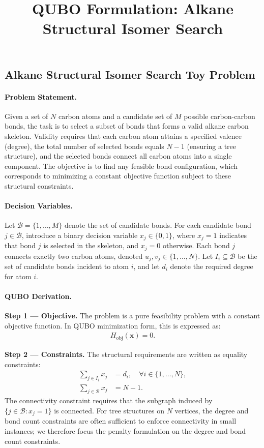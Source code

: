 \documentclass[12pt]{article}
\title{QUBO Formulation: Alkane Structural Isomer Search}
\date{}
\begin{document}
\maketitle

\subsection*{Alkane Structural Isomer Search Toy Problem}

\paragraph{Problem Statement.}
Given a set of $N$ carbon atoms and a candidate set of $M$ possible carbon-carbon bonds, the task is to select a subset of bonds that forms a valid alkane carbon skeleton. Validity requires that each carbon atom attains a specified valence (degree), the total number of selected bonds equals $N-1$ (ensuring a tree structure), and the selected bonds connect all carbon atoms into a single component. The objective is to find any feasible bond configuration, which corresponds to minimizing a constant objective function subject to these structural constraints.

\paragraph{Decision Variables.}
Let $\mathcal{B} = \{1, \dots, M\}$ denote the set of candidate bonds. For each candidate bond $j \in \mathcal{B}$, introduce a binary decision variable $x_j \in \{0, 1\}$, where $x_j = 1$ indicates that bond $j$ is selected in the skeleton, and $x_j = 0$ otherwise. Each bond $j$ connects exactly two carbon atoms, denoted $u_j, v_j \in \{1, \dots, N\}$. Let $I_i \subseteq \mathcal{B}$ be the set of candidate bonds incident to atom $i$, and let $d_i$ denote the required degree for atom $i$.

\paragraph{QUBO Derivation.}
\textbf{Step 1 --- Objective.} The problem is a pure feasibility problem with a constant objective function. In QUBO minimization form, this is expressed as:
\begin{align}
H_{\text{obj}}(\mathbf{x}) = 0.
\end{align}

\textbf{Step 2 --- Constraints.} The structural requirements are written as equality constraints:
\begin{align}
\sum_{j \in I_i} x_j &= d_i, \quad \forall i \in \{1, \dots, N\}, \tag{Degree} \\
\sum_{j \in \mathcal{B}} x_j &= N - 1. \tag{Bond Count}
\end{align}
The connectivity constraint requires that the subgraph induced by $\{j \in \mathcal{B} : x_j = 1\}$ is connected. For tree structures on $N$ vertices, the degree and bond count constraints are often sufficient to enforce connectivity in small instances; we therefore focus the penalty formulation on the degree and bond count constraints.
\end{document}
